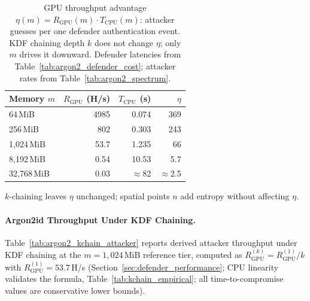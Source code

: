 \documentclass[journal,article,submit,pdftex,moreauthors]{Definitions/mdpi}
\newcommand{\add}[1]{#1}
\newcommand{\add}[1]{\added{#1}}
\begin{document}
\begin{table}[H]
\caption{\add{GPU throughput advantage $\eta(m) = R_\text{GPU}(m)\cdot T_\text{CPU}(m)$: attacker guesses per one defender authentication event. KDF chaining depth $k$ does not change $\eta$; only $m$ drives it downward. Defender latencies from Table~\ref{tab:argon2_defender_cost}; attacker rates from Table~\ref{tab:argon2_spectrum}.}}
\label{tab:eta}
\centering
\begin{minipage}{0.55\linewidth}
\centering
\begin{tabular}{lrrr}
\toprule
\textbf{Memory $m$} & \textbf{$R_\text{GPU}$ (H/s)} & \textbf{$T_\text{CPU}$ (s)} & \textbf{$\eta$} \\
\midrule
64\,MiB       & 4985  & 0.074       & 369           \\
256\,MiB      & 802   & 0.303       & 243           \\
1{,}024\,MiB  & 53.7  & 1.235       &  66           \\
8{,}192\,MiB  & 0.54  & 10.53       & 5.7           \\
32{,}768\,MiB & 0.03  & $\approx$82 & $\approx$2.5  \\
\bottomrule
\end{tabular}
\par\smallskip
{\footnotesize $k$-chaining leaves $\eta$ unchanged; spatial points $n$ add entropy without affecting $\eta$.}
\end{minipage}
\end{table}

\paragraph{\add{Argon2id Throughput Under KDF Chaining.}}
\add{Table~\ref{tab:argon2_kchain_attacker} reports derived attacker throughput under KDF chaining at the $m=1{,}024$\,MiB reference tier, computed as $R_\text{GPU}^{(k)} = R_\text{GPU}^{(1)} / k$ with $R_\text{GPU}^{(1)} = 53.7$\,H/s (Section~\ref{sec:defender_performance}; CPU linearity validates the formula, Table~\ref{tab:kchain_empirical}; all time-to-compromise values are conservative lower bounds).}
\end{document}
